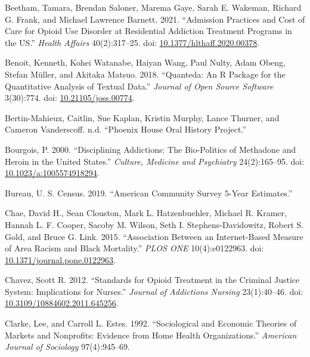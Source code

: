 \documentclass[
  12pt,
]{article}
\begin{document}
\leavevmode\hypertarget{ref-beetham2021}{}%
Beetham, Tamara, Brendan Saloner, Marema Gaye, Sarah E. Wakeman, Richard G. Frank, and Michael Lawrence Barnett. 2021. ``Admission Practices and Cost of Care for Opioid Use Disorder at Residential Addiction Treatment Programs in the US.'' \emph{Health Affairs} 40(2):317--25. doi: \href{https://doi.org/10.1377/hlthaff.2020.00378}{10.1377/hlthaff.2020.00378}.

\leavevmode\hypertarget{ref-benoit2018}{}%
Benoit, Kenneth, Kohei Watanabe, Haiyan Wang, Paul Nulty, Adam Obeng, Stefan Müller, and Akitaka Matsuo. 2018. ``Quanteda: An R Package for the Quantitative Analysis of Textual Data.'' \emph{Journal of Open Source Software} 3(30):774. doi: \href{https://doi.org/10.21105/joss.00774}{10.21105/joss.00774}.

\leavevmode\hypertarget{ref-bertin-mahieux}{}%
Bertin-Mahieux, Caitlin, Sue Kaplan, Kristin Murphy, Lance Thurner, and Cameron Vanderscoff. n.d. ``Phoenix House Oral History Project.''

\leavevmode\hypertarget{ref-bourgois2000}{}%
Bourgois, P. 2000. ``Disciplining Addictions: The Bio-Politics of Methadone and Heroin in the United States.'' \emph{Culture, Medicine and Psychiatry} 24(2):165--95. doi: \href{https://doi.org/10.1023/a:1005574918294}{10.1023/a:1005574918294}.

\leavevmode\hypertarget{ref-u.scensusbureau2019}{}%
Bureau, U. S. Census. 2019. ``American Community Survey 5-Year Estimates.''

\leavevmode\hypertarget{ref-chae2015}{}%
Chae, David H., Sean Clouston, Mark L. Hatzenbuehler, Michael R. Kramer, Hannah L. F. Cooper, Sacoby M. Wilson, Seth I. Stephens-Davidowitz, Robert S. Gold, and Bruce G. Link. 2015. ``Association Between an Internet-Based Measure of Area Racism and Black Mortality.'' \emph{PLOS ONE} 10(4):e0122963. doi: \href{https://doi.org/10.1371/journal.pone.0122963}{10.1371/journal.pone.0122963}.

\leavevmode\hypertarget{ref-chavez2012}{}%
Chavez, Scott R. 2012. ``Standards for Opioid Treatment in the Criminal Justice System: Implications for Nurses.'' \emph{Journal of Addictions Nursing} 23(1):40--46. doi: \href{https://doi.org/10.3109/10884602.2011.645256}{10.3109/10884602.2011.645256}.

\leavevmode\hypertarget{ref-clarke1992}{}%
Clarke, Lee, and Carroll L. Estes. 1992. ``Sociological and Economic Theories of Markets and Nonprofits: Evidence from Home Health Organizations.'' \emph{American Journal of Sociology} 97(4):945--69.
\end{document}
